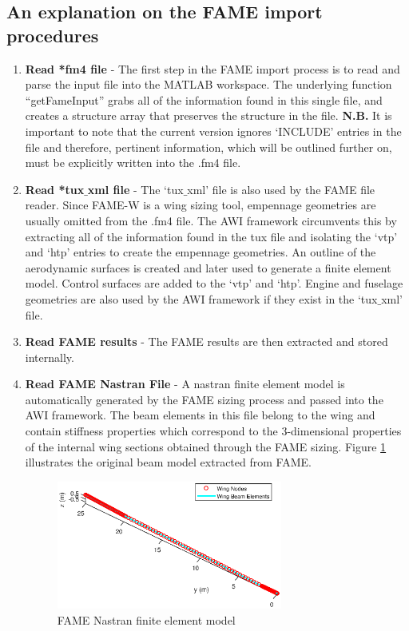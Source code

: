\subsection*{An explanation on the FAME import procedures}

\begin{enumerate}
\item \textbf{Read *fm4 file} - The first step in the FAME import process is to read and parse the input file into the MATLAB workspace. The underlying function ``getFameInput'' grabs all of the information found in this single file, and creates a structure array that preserves the structure in the file. \textbf{N.B.} It is important to note that the current version ignores `INCLUDE' entries in the file and therefore, pertinent information, which will be outlined further on, must be explicitly written into the .fm4 file. 

\item \textbf{Read *tux$\_$xml file} - The `tux$\_$xml' file is also used by the FAME file reader. Since FAME-W is a wing sizing tool, empennage geometries are usually omitted from the .fm4 file. The AWI framework circumvents this by extracting all of the information found in the tux file and isolating the `vtp' and `htp' entries to create the empennage geometries. An outline of the aerodynamic surfaces is created and later used to generate a finite element model. Control surfaces are added to the `vtp' and `htp'. Engine and fuselage geometries are also used by the AWI framework if they exist in the `tux$\_$xml' file.

\item \textbf{Read FAME results} - The FAME results are then extracted and stored internally.

\item \textbf{Read FAME Nastran File} - A nastran finite element model is automatically generated by the FAME sizing process and passed into the AWI framework. The beam elements in this file belong to the wing and contain stiffness properties which correspond to the 3-dimensional properties of the internal wing sections obtained through the FAME sizing. Figure \ref{fig:FAMENastranModel} illustrates the original beam model extracted from FAME.

\begin{figure}[h!]
\centering
\includegraphics[width = 0.7\textwidth]{FAMENastranModel}
\caption{FAME Nastran finite element model}\label{fig:FAMENastranModel}
\end{figure}


\end{enumerate}
